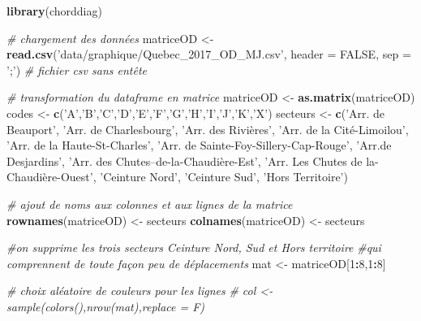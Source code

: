 \documentclass[
  11pt,
  french,
]{book}
\makeatletter
\newenvironment{Shaded}{\begin{snugshade}}{\end{snugshade}}
\newcommand{\CommentTok}[1]{\textcolor[rgb]{0.56,0.35,0.01}{\textit{#1}}}
\newcommand{\DataTypeTok}[1]{\textcolor[rgb]{0.13,0.29,0.53}{#1}}
\newcommand{\DecValTok}[1]{\textcolor[rgb]{0.00,0.00,0.81}{#1}}
\newcommand{\KeywordTok}[1]{\textcolor[rgb]{0.13,0.29,0.53}{\textbf{#1}}}
\newcommand{\NormalTok}[1]{#1}
\newcommand{\OperatorTok}[1]{\textcolor[rgb]{0.81,0.36,0.00}{\textbf{#1}}}
\newcommand{\OtherTok}[1]{\textcolor[rgb]{0.56,0.35,0.01}{#1}}
\newcommand{\StringTok}[1]{\textcolor[rgb]{0.31,0.60,0.02}{#1}}
\newenvironment{kframe}{%
\medskip{}
\setlength{\fboxsep}{.8em}
 \def\at@end@of@kframe{}%
 \ifinner\ifhmode%
  \def\at@end@of@kframe{\end{minipage}}%
  \begin{minipage}{\columnwidth}%
 \fi\fi%
 \def\FrameCommand##1{\hskip\@totalleftmargin \hskip-\fboxsep
 \colorbox{shadecolor}{##1}\hskip-\fboxsep
     \hskip-\linewidth \hskip-\@totalleftmargin \hskip\columnwidth}%
 \MakeFramed {\advance\hsize-\width
   \@totalleftmargin\z@ \linewidth\hsize
   \@setminipage}}%
 {\par\unskip\endMakeFramed%
 \at@end@of@kframe}
\renewenvironment{Shaded}{\begin{kframe}}{\end{kframe}}
\makeatother
\begin{document}
\begin{Shaded}
\begin{Highlighting}[]
\KeywordTok{library}\NormalTok{(chorddiag)}

\CommentTok{# chargement des données}
\NormalTok{matriceOD <-}\StringTok{ }\KeywordTok{read.csv}\NormalTok{(}\StringTok{'data/graphique/Quebec_2017_OD_MJ.csv'}\NormalTok{,}
                 \DataTypeTok{header =} \OtherTok{FALSE}\NormalTok{, }\DataTypeTok{sep =} \StringTok{';'}\NormalTok{) }\CommentTok{# fichier csv sans entête}

\CommentTok{# transformation du dataframe en matrice}
\NormalTok{matriceOD <-}\StringTok{ }\KeywordTok{as.matrix}\NormalTok{(matriceOD)}
\NormalTok{codes <-}\StringTok{ }\KeywordTok{c}\NormalTok{(}\StringTok{'A'}\NormalTok{,}\StringTok{'B'}\NormalTok{,}\StringTok{'C'}\NormalTok{,}\StringTok{'D'}\NormalTok{,}\StringTok{'E'}\NormalTok{,}\StringTok{'F'}\NormalTok{,}\StringTok{'G'}\NormalTok{,}\StringTok{'H'}\NormalTok{,}\StringTok{'I'}\NormalTok{,}\StringTok{'J'}\NormalTok{,}\StringTok{'K'}\NormalTok{,}\StringTok{'X'}\NormalTok{)}
\NormalTok{secteurs <-}\StringTok{ }\KeywordTok{c}\NormalTok{(}\StringTok{'Arr. de Beauport'}\NormalTok{,}
            \StringTok{'Arr. de Charlesbourg'}\NormalTok{,}
            \StringTok{'Arr. des Rivières'}\NormalTok{,}
            \StringTok{'Arr. de la Cité-Limoilou'}\NormalTok{,}
            \StringTok{'Arr. de la Haute-St-Charles'}\NormalTok{,}
            \StringTok{'Arr. de Sainte-Foy-Sillery-Cap-Rouge'}\NormalTok{,}
            \StringTok{'Arr.de Desjardins'}\NormalTok{,}
            \StringTok{'Arr. des Chutes–de-la-Chaudière-Est'}\NormalTok{,}
            \StringTok{'Arr. Les Chutes de la-Chaudière-Ouest'}\NormalTok{,}
            \StringTok{'Ceinture Nord'}\NormalTok{,}
            \StringTok{'Ceinture Sud'}\NormalTok{,}
            \StringTok{'Hors Territoire'}\NormalTok{)}

\CommentTok{# ajout de noms aux colonnes et aux lignes de la matrice}
\KeywordTok{rownames}\NormalTok{(matriceOD) <-}\StringTok{ }\NormalTok{secteurs}
\KeywordTok{colnames}\NormalTok{(matriceOD) <-}\StringTok{ }\NormalTok{secteurs}

\CommentTok{#on supprime les trois secteurs Ceinture Nord, Sud et Hors territoire }
\CommentTok{#qui comprennent de toute façon peu de déplacements}
\NormalTok{mat <-}\StringTok{ }\NormalTok{matriceOD[}\DecValTok{1}\OperatorTok{:}\DecValTok{8}\NormalTok{,}\DecValTok{1}\OperatorTok{:}\DecValTok{8}\NormalTok{]}

\CommentTok{# choix aléatoire de couleurs pour les lignes}
\CommentTok{# col <- sample(colors(),nrow(mat),replace = F)}


\end{Highlighting}
\end{Shaded}
\end{document}
